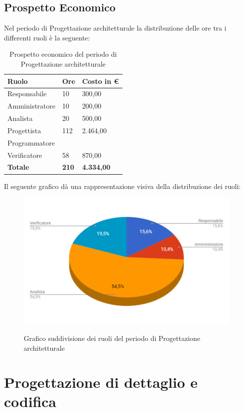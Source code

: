 \documentclass[PianoDiProgetto.tex]{subfiles}
\begin{document}
\subsection{Prospetto Economico}
Nel periodo di Progettazione architetturale la distribuzione delle ore tra i differenti ruoli è la seguente:
\begin{center}
\begin{table}[htbp]
	\centering
	\renewcommand\arraystretch{1.5}
	\begin{tabularx}{\textwidth}{p{5cm}|p{4cm}|p{4cm}}
		\hline
		\textbf{Ruolo} & \textbf{Ore} & \textbf{Costo in \euro} \\
		\hline
		Responsabile & 10 & 300,00 \\
		\hline
		Amministratore & 10 & 200,00 \\
		\hline
		Analista & 20 & 500,00 \\
		\hline
		Progettista & 112 & 2.464,00 \\
		\hline
		Programmatore & \ & \ \\
		\hline
		Verificatore & 58 & 870,00 \\
		\hline
		\textbf{Totale} & \textbf{210} & \textbf{4.334,00}\\
		\hline
	\end{tabularx}
	\caption{Prospetto economico del periodo di Progettazione architetturale}
	\label{my-label}
\end{table}
\end{center}
Il seguente grafico dà una rappresentazione visiva della distribuzione dei ruoli:
\begin{figure}[h]
	\centering
	\includegraphics[width=11cm]{images/prospettoEconomico/progArch.png}
	\label{fig:foo}
	\caption{Grafico suddivisione dei ruoli del periodo di Progettazione architetturale}
\end{figure} 
\newpage
\section{Progettazione di dettaglio e codifica}
\end{document}
